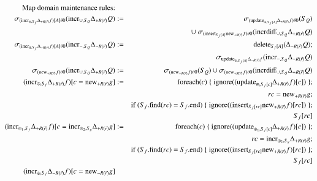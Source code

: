 \documentclass{article}
\begin{document}
%
\begin{figure*}
\begin{eqnarray}
\mbox{Map domain maintenance rules:} && \nonumber\\
\label{eq:md1}
\sigma_{(\algincr_{\oplus, S_f} \Delta_{+R(\vec{r})} f)[A] \theta 0} (\algincr_{\cup, S_Q}
\Delta_{+R(\vec{r})} Q)
&:=&
\sigma_{(\algupdate_{\oplus, S_{f}[A]} \Delta_{+R(\vec{r})} f) \theta 0} (S_Q)
\\
\nonumber && 
\cup\; 
\sigma_{(\alginsert_{S_{f}[A]} \algnew_{+R(\vec{r})} f) \theta 0}
(\algincrdiff_{\cup, S_Q} \Delta_{+R(\vec{r})} Q)
\\
\label{eq:md2}
\sigma_{(\algincr_{\oplus, S_f} \Delta_{-R(\vec{r})} f)[A] \theta 0}
(\algincr_{-,S_Q} \Delta_{-R(\vec{r})}Q) &:=&
\algdelete_{S_f[A]}(\Delta_{-R(\vec{r})} Q);
\\
\nonumber &&
\sigma_{\algupdate_{\oplus, S_f[A]} \Delta_{-R(\vec{r})}f}
(\algincr_{-,S_Q} \Delta_{-R(\vec{r})} Q)
\\
\label{eq:md3}
\sigma_{(\algnew_{+R(\vec{r})} f) \theta 0} (\algincr_{\cup, S_Q}
\Delta_{+R(\vec{r})} Q)
&:=&
\sigma_{(\algnew_{+R(\vec{r})} f) \theta 0} (S_Q)
\cup
\sigma_{(\algnew_{+R(\vec{r})} f) \theta 0}
(\algincrdiff_{\cup, S_Q} \Delta_{+R(\vec{r})} Q)
\\
\label{eq:md4}
(\algincr_{\oplus, S_f} \Delta_{+R(\vec{r})} f)[c=\algnew_{+R(\vec{r})} g]
&:=&
\algfor(c) \; \{ \; \mathrm{ignore}((\algupdate_{\oplus, S_{f}[c]} \Delta_{+R(\vec{r})} f)[c]) \; \};
\\
\nonumber && rc = \algnew_{+R(\vec{r})} g;
\\
\nonumber
&& \mbox{if ($S_f$.find($rc$) = $S_f$.end)}
\; \{ \; \mathrm{ignore}((\alginsert_{S_{f}[rc]} \algnew_{+R(\vec{r})} f)[rc]) \; \};
\\
\nonumber && S_{f}[rc]
\\
\label{eq:in5}
(\algincr_{\oplus_1, S_f} \Delta_{+R(\vec{r})} f)
[c=\algincr_{\oplus_2, S_g} \Delta_{+R(\vec{r})} g]
&:=&
\algfor(c) \; \{ \; \mathrm{ignore}((\algupdate_{\oplus_1, S_{f}[c]} \Delta_{+R(\vec{r})} f)[c]) \; \} ;
\\
\nonumber && rc = \algincr_{\oplus_2, S_g} \Delta_{+R(\vec{r})} g;
\\
\nonumber
&& \mbox{if ($S_f$.find($rc$) = $S_f$.end)}
\; \{ \; \mathrm{ignore}((\alginsert_{S_{f}[rc]} \algnew_{+R(\vec{r})} f)[rc]) \; \};
\\
\nonumber && S_{f}[rc]
\\
\label{eq:md6}
(\algincr_{\oplus, S_f}\Delta_{-R(\vec{r})} f)[c = \algnew_{-R(\vec{r})} g]

\end{eqnarray}
\end{figure*}
\end{document}
